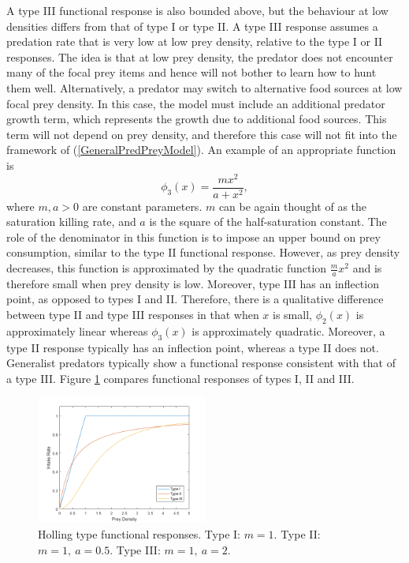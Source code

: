 \documentclass[12pt]{UOthesis}
\theoremstyle{remarkstyle}
\begin{document}
A type III functional response is also bounded above, but the behaviour at low densities differs from that of type I or type II. A type III response assumes a predation rate that is very low at low prey density, relative to the type I or II responses. The idea is that at low prey density, the predator does not encounter many of the focal prey items and hence will not bother to learn how to hunt them well. Alternatively, a predator may switch to alternative food sources at low focal prey density. In this case, the model must include an additional predator growth term, which represents the growth due to additional food sources. This term will not depend on prey density, and therefore this case will not fit into the framework of (\ref{GeneralPredPreyModel}). An example of an appropriate function is
\begin{equation}
	\phi_3(x)=\frac{mx^2}{a+x^2},
	\label{TypeIIIFR}
\end{equation}
where $m,a>0$ are constant parameters. $m$ can be again thought of as the saturation killing rate, and $a$ is the square of the half-saturation constant. The role of the denominator in this function is to impose an upper bound on prey consumption, similar to the type II functional response. However, as prey density decreases, this function is approximated by the quadratic function $\frac{m}{a}x^2$ and is therefore small when prey density is low. Moreover, type III has an inflection point, as opposed to types I and II. Therefore, there is a qualitative difference between type II and type III responses in that when $x$ is small, $\phi_2(x)$ is approximately linear whereas $\phi_3(x)$ is approximately quadratic. Moreover, a type II response typically has an inflection point, whereas a type II does not. Generalist predators typically show a functional response consistent with that of a type III. Figure \ref{HollingsTypes} compares functional responses of types I, II and III.\\

\begin{figure}[h]
	\centering
	\includegraphics[width=0.5\textwidth]{HollingsTypes.png}
	\caption[Holling type functional responses]{Holling type functional responses. Type I: $ m=1$. Type II: $m=1,\ a=0.5$. Type III: $m=1,\ a=2$.\label{HollingsTypes}}
\end{figure}
\end{document}
